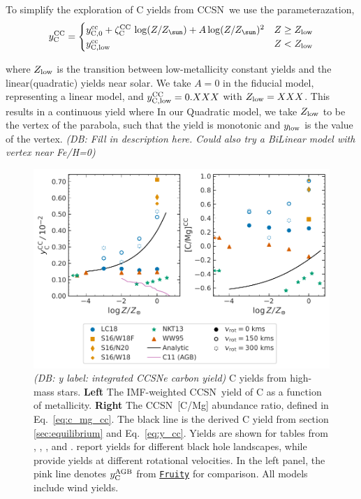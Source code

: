 \documentclass[fleqn,
usenatbib]{mnras}
\newcommand{\fruity}{\texttt{\hyperlink{fruity}{Fruity}}}
\newcommand{\cc}{CCSN}
\newcommand{\Ycc}{{y_{\rm C}^{\rm CC}}}
\newcommand{\Ycagb}{{y_{\rm C}^{\rm AGB}}}
\newcommand{\zcc}{\zeta_{\rm C}^{\rm CC}}
\newcommand{\Zo}{ Z_{\sun}}
\newcommand{\dbnote}[1]{ {\color{Thistle} \textit{\small (DB: #1)}} }
\begin{document}
To simplify the exploration of C yields from \cc\, we use the parameterazation, 
\begin{equation}\label{eq:y_cc}
    \Ycc = \begin{cases}
    y_{\rm C, 0}^{\rm cc} + \zcc\,\log(Z/\Zo) + A \log(Z/\Zo)^2 & Z \geq Z_{\rm low}
    \\
    y_{\rm C, low}^{\rm cc} & Z < Z_{\rm low}
    \end{cases}
\end{equation}

where $Z_{\rm low}$ is the transition between low-metallicity constant yields and the linear(quadratic) yields near solar. We take $A=0$ in the fiducial model, representing a linear model, and $y_{\rm C,low}^{\rm CC} = 0.XXX$ with $Z_{\rm low} = XXX$. This results in a continuous yield where 
In our Quadratic model, we take $Z_{\rm low}$ to be the vertex of the parabola, such that the yield is monotonic and $y_{\rm low}$ is the value of the vertex.
\dbnote{Fill in description here. Could also try a BiLinear model with vertex near Fe/H=0}
\begin{figure}
    \centering
    \includegraphics{cc_yields.pdf}
    \caption[]{
    \dbnote{y label: integrated CCSNe carbon yield}
        C yields from high-mass stars.
        \textbf{Left} The IMF-weighted \cc\ yield of C as a function of metallicity.
        \textbf{Right} The \cc\ [C/Mg] abundance ratio, defined in Eq.~\ref{eq:c_mg_cc}. The black line is the derived C yield from section \ref{sec:equilibrium} and Eq.~\ref{eq:y_cc}. Yields are shown for tables from 
    \citet[red triangles]{WW95}, \citet[orange square and diamond]{sukhbold+16}, 
    \citet[green stars]{NKT13}, and \citet[blue circles]{LC18}. \citet{sukhbold+16} report yields for different black hole landscapes, while \citet{LC18} provide yields at different rotational velocities.
    In the left panel, the pink line denotes $\Ycagb$ from \fruity{} for comparison. All models include wind yields. 
}
    \label{fig:y_cc}
\end{figure}
\end{document}

